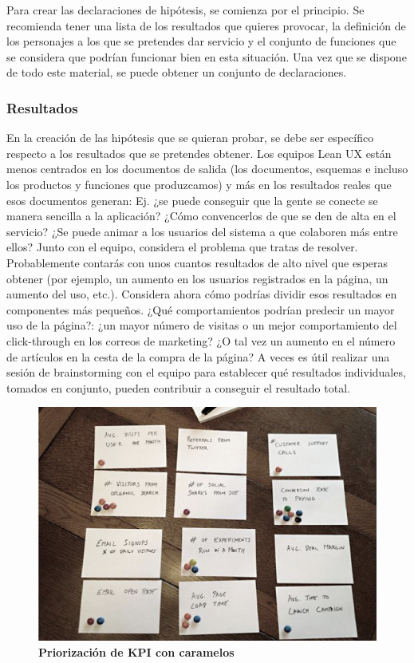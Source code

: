 Para crear las declaraciones de hipótesis, se comienza por el principio. Se recomienda tener una lista de los resultados que quieres provocar, la definición de los personajes a los que se pretendes dar servicio y el conjunto de funciones que se considera que podrían funcionar bien en esta situación. Una vez que se dispone de todo este material, se puede obtener un conjunto de declaraciones.


\subsubsection{Resultados}
En la creación de las hipótesis que se quieran probar, se debe ser específico respecto a los resultados que se pretendes obtener. Los equipos Lean UX están menos centrados en los documentos de salida (los documentos, esquemas e incluso los productos y funciones que produzcamos) y más en los resultados reales que esos documentos generan: Ej. ¿se puede conseguir que la gente se conecte se manera sencilla a la aplicación? ¿Cómo convencerlos de que se den de alta en el servicio? ¿Se puede animar a los usuarios del sistema a que colaboren más entre ellos? Junto con el equipo, considera el problema que tratas de resolver. Probablemente contarás con unos cuantos resultados de alto nivel que esperas obtener (por ejemplo, un aumento en los usuarios registrados en la página, un aumento del uso, etc.). Considera ahora cómo podrías dividir esos resultados en componentes más pequeños. ¿Qué comportamientos podrían predecir un mayor uso de la página?: ¿un mayor número de visitas o un mejor comportamiento del click-through en los correos de marketing? ¿O tal vez un aumento en el número de artículos en la cesta de la compra de la página? A veces es útil realizar una sesión de brainstorming con el equipo para establecer qué resultados individuales, tomados en conjunto, pueden contribuir a conseguir el resultado total.

\begin{figure}[h]
\includegraphics[width=12cm]{Img/Desarrollo/desarrollo2.jpg}
\centering
\caption{\textbf{ \footnotesize{ Priorización de KPI con caramelos }}}
\label{fig:priori}
\end{figure}

